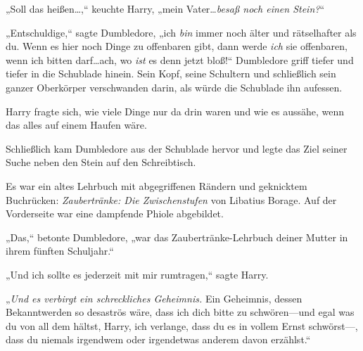 „Soll das heißen…,“ keuchte Harry, „mein Vater…\emph{besaß noch einen Stein?}“

„Entschuldige,“ sagte Dumbledore, „ich \emph{bin} immer noch älter und rätselhafter als du. Wenn es hier noch Dinge zu offenbaren gibt, dann werde \emph{ich} sie offenbaren, wenn ich bitten darf…ach, wo \emph{ist} es denn jetzt bloß!“ Dumbledore griff tiefer und tiefer in die Schublade hinein. Sein Kopf, seine Schultern und schließlich sein ganzer Oberkörper verschwanden darin, als würde die Schublade ihn aufessen.

Harry fragte sich, wie viele Dinge nur da drin waren und wie es aussähe, wenn das alles auf einem Haufen wäre.

Schließlich kam Dumbledore aus der Schublade hervor und legte das Ziel seiner Suche neben den Stein auf den Schreibtisch.

Es war ein altes Lehrbuch mit abgegriffenen Rändern und geknicktem Buchrücken: \emph{Zaubertränke: Die Zwischenstufen} von Libatius Borage. Auf der Vorderseite war eine dampfende Phiole abgebildet.

„Das,“ betonte Dumbledore, „war das Zaubertränke-Lehrbuch deiner Mutter in ihrem fünften Schuljahr.“

„Und ich sollte es jederzeit mit mir rumtragen,“ sagte Harry.

„\emph{Und es verbirgt ein schreckliches Geheimnis.} Ein Geheimnis, dessen Bekanntwerden so desaströs wäre, dass ich dich bitte zu schwören—und egal was du von all dem hältst, Harry, ich verlange, dass du es in vollem Ernst schwörst—, dass du niemals irgendwem oder irgendetwas anderem davon erzählst.“

